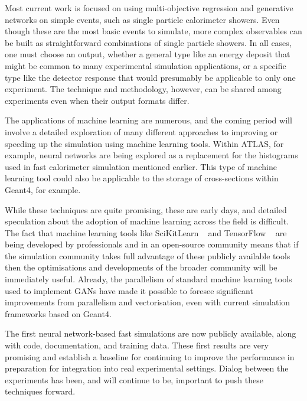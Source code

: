 \documentclass[12pt,a4paper]{article}
\begin{document}
{Most current work is focused on using multi-objective regression and
generative networks on simple events, such as single particle
calorimeter showers. Even though these are the most basic events to
simulate, more complex observables can be built as straightforward
combinations of single particle showers. In all cases, one must choose
an output, whether a general type like an energy deposit that might be
common to many experimental simulation applications, or a specific type
like the detector response that would presumably be applicable to only
one experiment. The technique and methodology, however, can be shared
among experiments even when their output formats differ.

The applications of machine learning are numerous, and the coming period
will involve a detailed exploration of many different approaches to
improving or speeding up the simulation using machine learning tools.
Within ATLAS, for example, neural networks are being explored as a
replacement for the histograms used in fast calorimeter simulation
mentioned earlier. This type of machine learning tool could also be
applicable to the storage of cross-sections within Geant4, for example.

While these techniques are quite promising, these are early days, and
detailed speculation about the adoption of machine learning across the
field is difficult. The fact that machine learning tools like
SciKitLearn ~\cite{DBLP:journals/corr/abs-1201-0490} and 
TensorFlow ~\cite{DBLP:journals/corr/AbadiABBCCCDDDG16} are being developed by
professionals and in an open-source community means that if the
simulation community takes full advantage of these publicly available
tools then the optimisations and developments of the broader community
will be immediately useful. Already, the parallelism of standard machine
learning tools used to implement GANs have made it possible to foresee
significant improvements from parallelism and vectorisation, even with
current simulation frameworks based on Geant4.

The first neural network-based fast simulations are now publicly
available, along with code, documentation, and training data. 
These first results are very promising and establish a
baseline for continuing to improve the performance in preparation for
integration into real experimental settings. Dialog between the
experiments has been, and will continue to be, important to push these
techniques forward.

}
\end{document}
